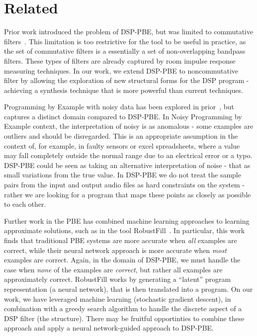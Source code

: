 \section{Related}

Prior work introduced the problem of DSP-PBE, but was limited to commutative filters~\cite{SantolucitoFARM}.
This limitation is too restrictive for the tool to be useful in practice, as the set of commutative filters is a essentially a set of non-overlapping bandpass filters.
These types of filters are already captured by room impulse response measuring techniques.
In our work, we extend DSP-PBE to noncommutative filter by allowing the exploration of new structural forms for the DSP program - achieving a synthesis technique that is more powerful than current techniques.

Programming by Example with noisy data has been explored in prior~\cite{raychev2016learning}, but captures a distinct domain compared to DSP-PBE.
In Noisy Programming by Example context, the interpretation of noisy is as anomalous - some examples are outliers and should be disregarded.
This is an appropriate assumption in the context of, for example, in faulty sensors or excel spreadsheets, where a value may fall completely outside the normal range due to an electrical error or a typo.
DSP-PBE could be seen as taking an alternative interpretation of noise - that as small variations from the true value.
In DSP-PBE we do not treat the sample pairs from the input and output audio files as hard constraints on the system - rather we are looking for a program that maps these points as closely as possible to each other.

Further work in the PBE has combined machine learning approaches to learning approximate solutions, such as in the tool RobustFill~\cite{devlin2017robustfill}.
In particular, this work finds that traditional PBE systems are more accurate when \textit{all} examples are correct, while their neural network approach is more accurate when \textit{most} examples are correct.
Again, in the domain of DSP-PBE, we must handle the case when \textit{none} of the examples are \textit{correct}, but rather all examples are approximately correct.
RobustFill works by generating a ``latent'' program representation (a neural network), that is then translated into a program.
On our work, we have leveraged machine learning (stochastic gradient descent), in combination with a greedy search algorithm to handle the discrete aspect of a DSP filter (the structure).
There may be fruitful opportinties to combine these approach and apply a neural network-guided approach to DSP-PBE.








